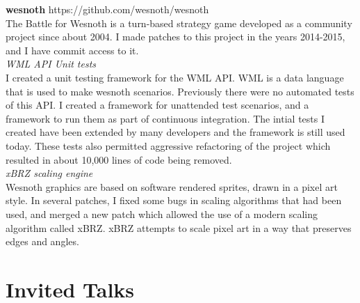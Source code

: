 \documentclass[margin,line]{resume}
\begin{document}
\begin{resume}
    \textbf{wesnoth} \hfill https://github.com/wesnoth/wesnoth \\
    The Battle for Wesnoth is a turn-based strategy game developed as a community project since about 2004.
    I made patches to this project in the years 2014-2015, and I have commit access to it. \\
    \textsl{WML API Unit tests} \\ I created a unit testing framework for the WML API. WML is a data language that is used
    to make wesnoth scenarios. Previously there were no automated tests of this API. I created a framework for unattended
    test scenarios, and a framework to run them as part of continuous integration. The intial tests I created have been
    extended by many developers and the framework is still used today.
    These tests also permitted aggressive refactoring of the project which resulted
    in about 10,000 lines of code being removed. \\
    \textsl{xBRZ scaling engine} \\ Wesnoth graphics are based on software rendered sprites, drawn in a pixel art style. In several patches,
    I fixed some bugs in scaling algorithms that had been used, and merged a new patch which allowed the use of a modern scaling algorithm
    called xBRZ. xBRZ attempts to scale pixel art in a way that preserves edges and angles. \\


    \section{\mysidestyle Invited Talks}


\end{resume}
\end{document}
